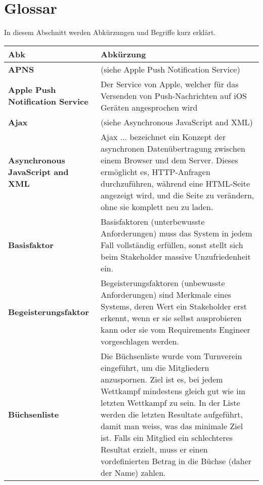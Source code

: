 %
%

\chapter*{Glossar}\label{chap.glossar}
\label{cha:glossar}

In diesem Abschnitt werden Abkürzungen und Begriffe kurz erklärt.

\begin{longtable}{|m{3cm}|m{11cm}|}\hline	
	\rowcolor{gray} \textbf{Abk}&
	Abkürzung \\ \hline		

	\textbf{APNS}&
	(siehe Apple Push Notification Service)\\ \hline	

	\textbf{Apple Push Notification Service}&
	Der Service von Apple, welcher für das Versenden von Push-Nachrichten auf iOS Geräten angesprochen wird\\ \hline

	\textbf{Ajax}&
	(siehe Asynchronous JavaScript and XML)\\ \hline	

	\textbf{Asynchronous JavaScript and XML}&
	Ajax ... bezeichnet ein Konzept der asynchronen Datenübertragung zwischen einem Browser und dem Server. Dieses ermöglicht es, HTTP-Anfragen durchzuführen, während eine HTML-Seite angezeigt wird, und die Seite zu verändern, ohne sie komplett neu zu laden.\cite{wiki_ajax}\\ \hline	

	\textbf{Basisfaktor}&
	Basisfaktoren (unterbewusste Anforderungen) muss das System in jedem Fall vollständig erfüllen, sonst stellt sich beim Stakeholder massive Unzufriedenheit ein. \cite{req_eng_book}\\ \hline	

	\textbf{Begeisterungsfaktor}&
	Begeisterungsfaktoren (unbewusste Anforderungen) sind Merkmale eines Systems, deren Wert ein Stakeholder erst erkennt, wenn er sie selbst ausprobieren kann oder sie vom Requirements Engineer vorgeschlagen werden.\cite{req_eng_book}\\ \hline

	\textbf{Büchsenliste}&
	Die Büchsenliste wurde vom Turnverein eingeführt, um die Mitgliedern anzuspornen. Ziel ist es, bei jedem Wettkampf mindestens gleich gut wie im letzten Wettkampf zu sein. In der Liste werden die letzten Resultate aufgeführt, damit man weiss, was das minimale Ziel ist. Falls ein Mitglied ein schlechteres Resultat erzielt, muss er einen vordefinierten Betrag in die Büchse (daher der Name) zahlen.\\ \hline


\end{longtable}
